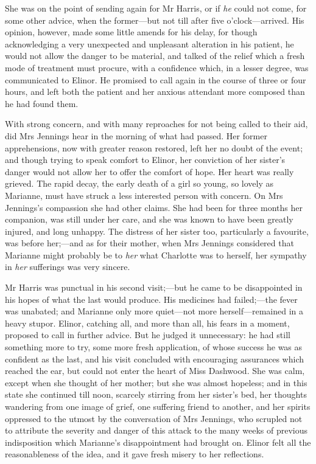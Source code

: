 She was on the point of sending again for Mr Harris, or if \textit{he} could not come, for some other advice, when the former—but not till after five o'clock—arrived. His opinion, however, made some little amends for his delay, for though acknowledging a very unexpected and unpleasant alteration in his patient, he would not allow the danger to be material, and talked of the relief which a fresh mode of treatment must procure, with a confidence which, in a lesser degree, was communicated to Elinor. He promised to call again in the course of three or four hours, and left both the patient and her anxious attendant more composed than he had found them.

With strong concern, and with many reproaches for not being called to their aid, did Mrs Jennings hear in the morning of what had passed. Her former apprehensions, now with greater reason restored, left her no doubt of the event; and though trying to speak comfort to Elinor, her conviction of her sister's danger would not allow her to offer the comfort of hope. Her heart was really grieved. The rapid decay, the early death of a girl so young, so lovely as Marianne, must have struck a less interested person with concern. On Mrs Jennings's compassion she had other claims. She had been for three months her companion, was still under her care, and she was known to have been greatly injured, and long unhappy. The distress of her sister too, particularly a favourite, was before her;—and as for their mother, when Mrs Jennings considered that Marianne might probably be to \textit{her} what Charlotte was to herself, her sympathy in \textit{her} sufferings was very sincere.

Mr Harris was punctual in his second visit;—but he came to be disappointed in his hopes of what the last would produce. His medicines had failed;—the fever was unabated; and Marianne only more quiet—not more herself—remained in a heavy stupor. Elinor, catching all, and more than all, his fears in a moment, proposed to call in further advice. But he judged it unnecessary: he had still something more to try, some more fresh application, of whose success he was as confident as the last, and his visit concluded with encouraging assurances which reached the ear, but could not enter the heart of Miss Dashwood. She was calm, except when she thought of her mother; but she was almost hopeless; and in this state she continued till noon, scarcely stirring from her sister's bed, her thoughts wandering from one image of grief, one suffering friend to another, and her spirits oppressed to the utmost by the conversation of Mrs Jennings, who scrupled not to attribute the severity and danger of this attack to the many weeks of previous indisposition which Marianne's disappointment had brought on. Elinor felt all the reasonableness of the idea, and it gave fresh misery to her reflections.

